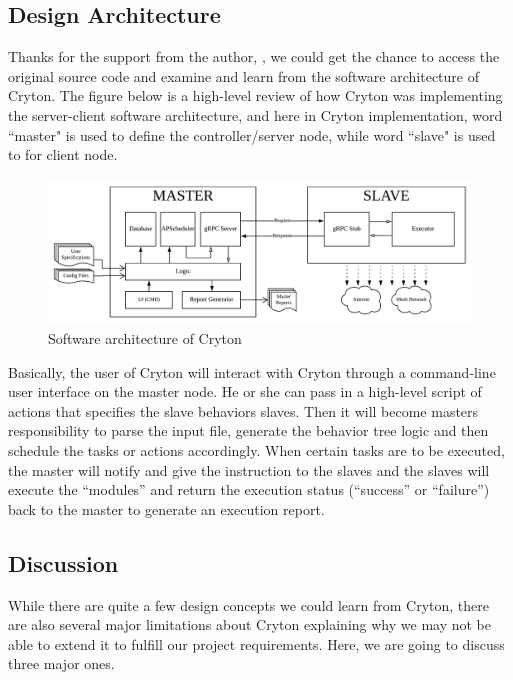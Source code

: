 \documentclass[12pt]{report}
\begin{document}
\subsection{Design Architecture}

Thanks for the support from the author, \citet{Cryton}, we could get the chance to access the original source code and examine and learn from the software architecture of Cryton. The figure below is a high-level review of how Cryton was implementing the server-client software architecture, and here in Cryton implementation, word ``master" is used to define the controller/server node, while word ``slave" is used to for client node.

\begin{figure}[h!]
	\centering
	\includegraphics[width=1\textwidth]{./pictures/cryton-arc}
	\caption{Software architecture of Cryton}
\end{figure}

Basically, the user of Cryton will interact with Cryton through a command-line user interface on the master node. He or she can pass in a high-level script of actions that specifies the slave behaviors slaves. Then it will become master\textquotesingle s responsibility to parse the input file, generate the behavior tree logic and then schedule the tasks or actions accordingly. When certain tasks are to be executed, the master will notify and give the instruction to the slaves and the slaves will execute the “modules” and return the execution status (“success” or “failure”) back to the master to generate an execution report.


\subsection{Discussion}
While there are quite a few design concepts we could learn from Cryton, there are also several major limitations about Cryton explaining why we may not be able to extend it to fulfill our project requirements. Here, we are going to discuss three major ones.\\
\end{document}

